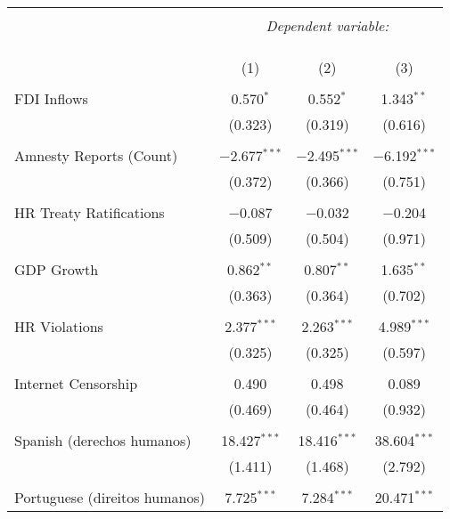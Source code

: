 
\begin{table}[!htbp] \centering 
  \caption{} 
  \label{} 
\begin{tabular}{@{\extracolsep{5pt}}lccc} 
\\[-1.8ex]\hline 
\hline \\[-1.8ex] 
 & \multicolumn{3}{c}{\textit{Dependent variable:}} \\ 
\cline{2-4} 
\\[-1.8ex] & \multicolumn{3}{c}{ } \\ 
\\[-1.8ex] & (1) & (2) & (3)\\ 
\hline \\[-1.8ex] 
 FDI Inflows & 0.570$^{*}$ & 0.552$^{*}$ & 1.343$^{**}$ \\ 
  & (0.323) & (0.319) & (0.616) \\ 
  & & & \\ 
 Amnesty Reports (Count) & $-$2.677$^{***}$ & $-$2.495$^{***}$ & $-$6.192$^{***}$ \\ 
  & (0.372) & (0.366) & (0.751) \\ 
  & & & \\ 
 HR Treaty Ratifications & $-$0.087 & $-$0.032 & $-$0.204 \\ 
  & (0.509) & (0.504) & (0.971) \\ 
  & & & \\ 
 GDP Growth & 0.862$^{**}$ & 0.807$^{**}$ & 1.635$^{**}$ \\ 
  & (0.363) & (0.364) & (0.702) \\ 
  & & & \\ 
 HR Violations & 2.377$^{***}$ & 2.263$^{***}$ & 4.989$^{***}$ \\ 
  & (0.325) & (0.325) & (0.597) \\ 
  & & & \\ 
 Internet Censorship & 0.490 & 0.498 & 0.089 \\ 
  & (0.469) & (0.464) & (0.932) \\ 
  & & & \\ 
 Spanish (derechos humanos) & 18.427$^{***}$ & 18.416$^{***}$ & 38.604$^{***}$ \\ 
  & (1.411) & (1.468) & (2.792) \\ 
  & & & \\ 
 Portuguese (direitos humanos) & 7.725$^{***}$ & 7.284$^{***}$ & 20.471$^{***}$ \\ 

\end{tabular}
\end{table}
